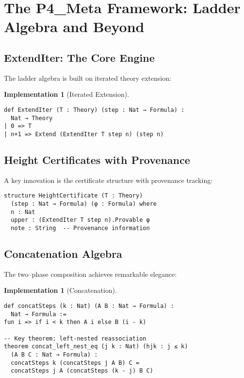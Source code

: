 \documentclass[11pt]{article}
\theoremstyle{definition}
\newtheorem{implementation}[theorem]{Implementation}
\theoremstyle{remark}
\begin{document}
\section{The P4\_Meta Framework: Ladder Algebra and Beyond}

\subsection{ExtendIter: The Core Engine}

The ladder algebra is built on iterated theory extension:

\begin{implementation}[Iterated Extension]
\begin{lstlisting}[language={}]
def ExtendIter (T : Theory) (step : Nat → Formula) : 
  Nat → Theory
| 0 => T
| n+1 => Extend (ExtendIter T step n) (step n)
\end{lstlisting}
\end{implementation}

\subsection{Height Certificates with Provenance}

A key innovation is the certificate structure with provenance tracking:

\begin{lstlisting}[language={}]
structure HeightCertificate (T : Theory) 
  (step : Nat → Formula) (φ : Formula) where
  n : Nat
  upper : (ExtendIter T step n).Provable φ
  note : String  -- Provenance information
\end{lstlisting}

\subsection{Concatenation Algebra}

The two--phase composition achieves remarkable elegance:

\begin{implementation}[Concatenation]
\begin{lstlisting}[language={}]
def concatSteps (k : Nat) (A B : Nat → Formula) : 
  Nat → Formula :=
fun i => if i < k then A i else B (i - k)

-- Key theorem: left-nested reassociation
theorem concat_left_nest_eq (j k : Nat) (hjk : j ≤ k) 
  (A B C : Nat → Formula) :
  concatSteps k (concatSteps j A B) C = 
  concatSteps j A (concatSteps (k - j) B C)
\end{lstlisting}
\end{implementation}
\end{document}
